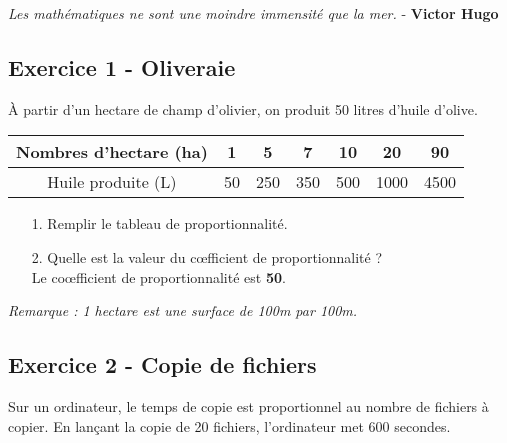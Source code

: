 \documentclass[12pt]{article}
\begin{document}

\begin{center}
\textit{Les mathématiques ne sont une moindre immensité que la mer.} - \textbf{Victor Hugo}
\end{center}

\subsection*{Exercice 1 - Oliveraie}

À partir d'un hectare de champ d'olivier, on produit 50 litres d'huile d'olive. 

\begin{center}
  \begin{tabular}{| c ||       c | c | c |  c |  c |  c|}
    \hline
    Nombres d'hectare (ha) &  1 &   5&    7 &  10 &   20 & 90 \\
    \hline
    Huile produite (L)     & 50 & 250 & 350 & 500 & 1000 & 4500 \\ 
    \hline
  \end{tabular}
\end{center}


\begin{enumerate}
\item[1.] Remplir le tableau de proportionnalité. 
\item[2.] Quelle est la valeur du cœfficient de proportionnalité ?\\
Le coœfficient de proportionnalité est \textbf{50}.\\
\end{enumerate}


\textit{Remarque : 1 hectare est une surface de 100m par 100m.}

\subsection*{Exercice 2 - Copie de fichiers}

Sur un ordinateur, le temps de copie est proportionnel au nombre de fichiers à copier. En lançant la copie de 20 fichiers, l'ordinateur met 600 secondes. 
\end{document}
